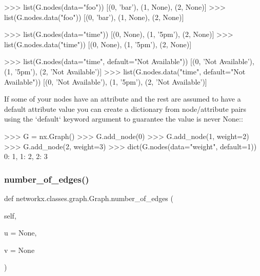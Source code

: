\begin{DoxyVerb}
>>> list(G.nodes(data="foo"))
[(0, 'bar'), (1, None), (2, None)]
>>> list(G.nodes.data("foo"))
[(0, 'bar'), (1, None), (2, None)]

>>> list(G.nodes(data="time"))
[(0, None), (1, '5pm'), (2, None)]
>>> list(G.nodes.data("time"))
[(0, None), (1, '5pm'), (2, None)]

>>> list(G.nodes(data="time", default="Not Available"))
[(0, 'Not Available'), (1, '5pm'), (2, 'Not Available')]
>>> list(G.nodes.data("time", default="Not Available"))
[(0, 'Not Available'), (1, '5pm'), (2, 'Not Available')]

If some of your nodes have an attribute and the rest are assumed
to have a default attribute value you can create a dictionary
from node/attribute pairs using the `default` keyword argument
to guarantee the value is never None::

    >>> G = nx.Graph()
    >>> G.add_node(0)
    >>> G.add_node(1, weight=2)
    >>> G.add_node(2, weight=3)
    >>> dict(G.nodes(data="weight", default=1))
    {0: 1, 1: 2, 2: 3}\end{DoxyVerb}
 \mbox{\label{classnetworkx_1_1classes_1_1graph_1_1Graph_ab8099b482e74662582c105e2f9476a7f}} 
\subsubsection{\texorpdfstring{number\+\_\+of\+\_\+edges()}{number\_of\_edges()}}
{\footnotesize\ttfamily def networkx.\+classes.\+graph.\+Graph.\+number\+\_\+of\+\_\+edges (\begin{DoxyParamCaption}\item[{}]{self,  }\item[{}]{u = {\ttfamily None},  }\item[{}]{v = {\ttfamily None} }\end{DoxyParamCaption})}

